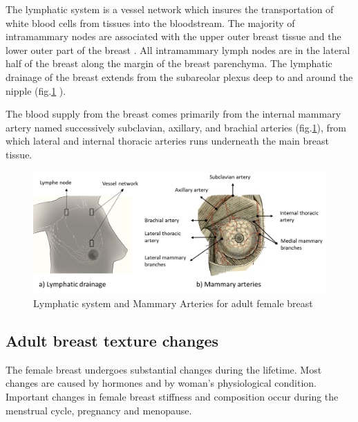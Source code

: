 The lymphatic system is a vessel network which insures the transportation of white blood cells from tissues into the bloodstream. The majority of intramammary nodes are associated with the upper outer breast tissue and the lower outer part of the breast \citep{kopans2007breast}.  All intramammary lymph nodes are in the lateral half of the breast along the margin of the breast parenchyma.  The lymphatic drainage of the breast extends from the subareolar plexus deep to and around the nipple (fig.\ref{fig:lyphaticDrainageandArtery} ).

The blood supply from the breast comes primarily from the internal mammary artery named successively subclavian, axillary, and brachial arteries (fig.\ref{fig:lyphaticDrainageandArtery}), from which lateral and internal thoracic arteries runs underneath the main breast tissue.

	
\begin{figure}[!h]
\centering
\includegraphics[width=\textwidth,keepaspectratio]{figures/lyphaticDrainageandArtery.PNG} 
\caption[Lymphatic system and Mammary Arteries for adult female breast]{Lymphatic system and Mammary Arteries for adult female breast}
\label{fig:lyphaticDrainageandArtery}
\end{figure}





\subsection{Adult breast texture changes}\label{subsection:adultbreasttexturechanges}

The female breast undergoes substantial changes during the lifetime.  Most changes are caused by hormones and by woman's physiological condition. Important changes in female breast stiffness and composition occur during the menstrual cycle, pregnancy and menopause. 

